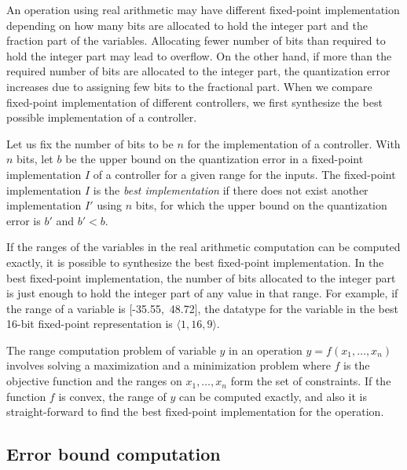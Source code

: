 \documentclass{amsart}
\numberwithin{equation}{section}
\def\tuple#1{{ \langle #1 \rangle}}
\begin{document}
An operation using real arithmetic may have different fixed-point implementation depending on
how many bits are allocated to hold the integer part and the fraction part of the variables. 
Allocating fewer number of bits than required to hold the integer part may lead to overflow. 
On the other hand, if more than the required number of bits are allocated to the integer part, 
the quantization error increases due to assigning few bits to the fractional part. 
When we compare fixed-point implementation of different controllers, we first synthesize the best 
possible implementation of a controller. 

Let us fix the number of bits to be $n$ for the implementation of a controller. 
With $n$ bits, let $b$ be the upper bound on the quantization error in a fixed-point implementation $I$ of a controller
for a given range for the inputs. 
The fixed-point implementation $I$ is the {\em best implementation} if  there 
does not exist another implementation $I'$ using $n$ bits, 
for which the upper bound on the quantization error is $b'$ and $b' < b$.


If the ranges of the variables in the real arithmetic computation can be computed exactly,  
it is possible to synthesize the best fixed-point implementation. In the best fixed-point implementation,
the number of bits allocated to the integer part is just enough to hold the integer part of any value in that range.
For example, if the range of a variable is \mbox{[-35.55,~48.72]}, the datatype for the variable in the best
16-bit fixed-point representation is $\tuple{1,16, 9}$.  

The range computation problem
of variable $y$ in an operation 
$y = f(x_1, \ldots , x_n)$
involves solving a maximization and a minimization
problem where $f$ is the objective function and the ranges on $x_1, \ldots, x_n$ form the set of constraints.
If the function $f$ is convex, the range of $y$ can be computed exactly, and also it is straight-forward to find 
the best fixed-point implementation for the operation. 


\subsection{Error bound computation}
\end{document}
